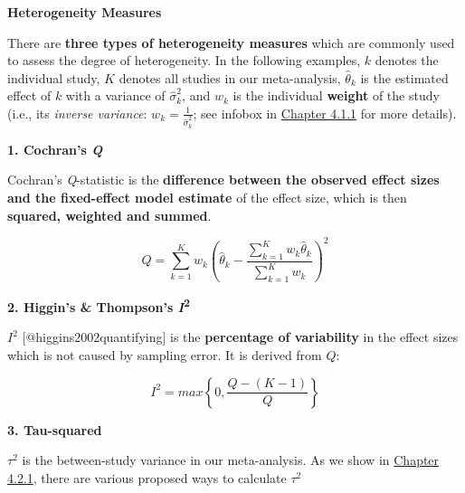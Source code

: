 \documentclass[]{book}
\theoremstyle{definition}
\theoremstyle{definition}
\theoremstyle{definition}
\theoremstyle{remark}
\begin{document}
\begin{rmdinfo}
\textbf{Heterogeneity Measures}

There are \textbf{three types of heterogeneity measures} which are
commonly used to assess the degree of heterogeneity. In the following
examples, \(k\) denotes the individual study, \(K\) denotes all studies
in our meta-analysis, \(\hat \theta_k\) is the estimated effect of \(k\)
with a variance of \(\hat \sigma^{2}_k\), and \(w_k\) is the individual
\textbf{weight} of the study (i.e., its \emph{inverse variance}:
\(w_k = \frac{1}{\hat \sigma^{2}_k}\); see infobox in
\protect\hyperlink{fixed}{Chapter 4.1.1} for more details).

\textbf{1. Cochran's \emph{Q} }

Cochran's \emph{Q}-statistic is the \textbf{difference between the
observed effect sizes and the fixed-effect model estimate} of the effect
size, which is then \textbf{squared, weighted and summed}.

\[ Q = \sum\limits_{k=1}^K w_k (\hat\theta_k  - \frac{\sum\limits_{k=1}^K w_k \hat\theta_k}{\sum\limits_{k=1}^K w_k})^{2}\]

\textbf{2. Higgin's \& Thompson's \emph{I}\textsuperscript{2} }

\(I^{2}\) {[}@higgins2002quantifying{]} is the \textbf{percentage of
variability} in the effect sizes which is not caused by sampling error.
It is derived from \(Q\):

\[I^{2} = max \left\{0, \frac{Q-(K-1)}{Q}  \right\}\]

\textbf{3. Tau-squared}

\(\tau^{2}\) is the between-study variance in our meta-analysis. As we
show in \protect\hyperlink{tau2}{Chapter 4.2.1}, there are various
proposed ways to calculate \(\tau^{2}\)
\end{rmdinfo}
\end{document}
